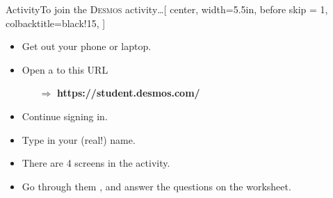\begin{myAnnotate}{{Activity}}{To join the {\scshape Desmos} activity\dots}[%
    center,
    width=5.5in,
    before skip = 1\baselineskip,
    colbacktitle=black!15,
    ]
    \begin{itemize}[nosep]
        \item Get out your phone or laptop.
        \item Open a  to this URL
        \begin{itemize}
            \item[$\Rightarrow$] {\bfseries\ttfamily https://student.desmos.com/}
        \end{itemize}
        \begin{center}
        \end{center}
    \item Continue  signing in.
        \item Type in your (real!) name.
        \item There are 4 screens in the activity. 
            \begin{center}
            \end{center}
        \item Go through them , 
        and answer the questions on the worksheet.
    \end{itemize}
\end{myAnnotate}

\vfill{}